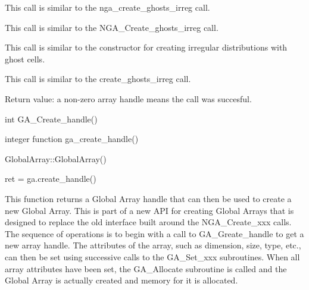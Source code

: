 \documentclass[12pt]{article}
\begin{document}
\begin{fdesc}
This call is similar to the nga_create_ghosts_irreg call.
\end{fdesc}

\begin{cdesc}
This call is similar to the NGA_Create_ghosts_irreg call.
\end{cdesc}

\begin{cxxdesc}
This call is similar to the constructor for creating irregular distributions
with ghost cells.
\end{cxxdesc}

\begin{pydesc}
This call is similar to the create_ghosts_irreg call.
\end{pydesc}

\begin{desc}
Return value: a non-zero array handle means the call was succesful.

\end{desc}



\begin{capi}
\begin{ccode}
int GA_Create_handle()
\end{ccode}
\end{capi}

\begin{fapi}
\begin{fcode}
integer function ga_create_handle()
\end{fcode}
\end{fapi}

\begin{cxxapi}
\begin{cxxcode}
GlobalArray::GlobalArray()
\end{cxxcode}
\end{cxxapi}

\begin{pyapi}
\begin{pycode}
ret = ga.create_handle()
\end{pycode}
\end{pyapi}

\dcoll

\begin{desc}

This function returns a Global Array handle that can then be used to create a
new Global Array. This is part of a new API for creating Global Arrays that is
designed to replace the old interface built around the NGA_Create_xxx calls.
The sequence of operations is to begin with a call to GA_Greate_handle to get a
new array handle. The attributes of the array, such as dimension, size, type,
etc., can then be set using successive calls to the GA_Set_xxx subroutines.
When all array attributes have been set, the GA_Allocate subroutine is called
and the Global Array is actually created and memory for it is allocated.

\end{desc}
\end{document}
